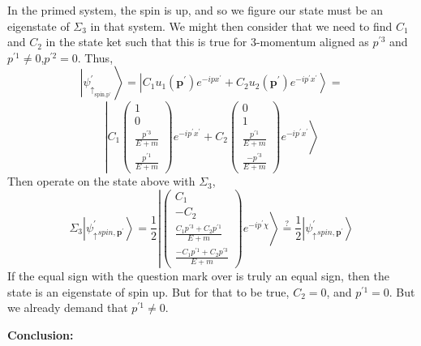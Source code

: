 In the primed system, the spin is up, and so we figure our state must be an eigenstate of $\Sigma_3$ in that system. We might then consider that we need to find $C_1$ and $C_2$ in the state ket such that this is true for 3-momentum aligned as $p^{\prime 3}$ and $p^{\prime 1}\neq 0$,$p^{\prime 2}=0$. Thus,
$$
\left|\psi^{\prime}_{\uparrow_{\text {spin,p' }}}\right\rangle=\left|C_{1} u_{1}\left(\mathbf{p}^{\prime}\right) e^{-i p x^{\prime}}+C_{2} u_{2}\left(\mathbf{p}^{\prime}\right) e^{-i p^{\prime} x^{\prime}}\right\rangle=
$$
$$
\left|C_{1}\left(\begin{array}{c}
{1} \\
{0} \\
{\frac{p^{\prime 3}}{E+m}} \\
{\frac{p^{\prime 1}}{E+m}}
\end{array}\right) e^{-i p^{\prime} x^{\prime}}+C_{2}\left(\begin{array}{c}
{0} \\
{1} \\
{\frac{p^{\prime 1}}{E+m}} \\
{\frac{-p^{\prime 3}}{E+m}}
\end{array}\right) e^{-i p^{\prime} x^{\prime}}\right\rangle
$$
Then operate on the state above with $\Sigma_3$,
$$
\Sigma_{3}\left|\psi_{\uparrow}^{\prime} {}_{spin,\mathbf{p}^{\prime}}\right\rangle=\frac{1}{2}\left|\left(\begin{array}{c}
{C_{1}} \\
{-C_{2}} \\
{\frac{C_{1} p^{\prime 3}+C_{2} p^{\prime 1}}{E+m}} \\
{\frac{-C_{1} p^{\prime 1}+C_{2} p^{\prime 3}}{E+m}}
\end{array}\right) e^{-i p^{\prime} \chi}\right\rangle\overset{?}{=}\frac{1}{2}\left|\psi_{\uparrow}^{\prime} {}_{spin,\mathbf{p}^{\prime}}\right\rangle
$$
If the equal sign with the question mark over is truly an equal sign, then the state is an eigenstate of spin up. But for that to be true, $C_2=0$, and $p^{\prime 1}=0$. But we already demand that $p^{\prime 1}\neq0$.

\textbf{Conclusion:} 

